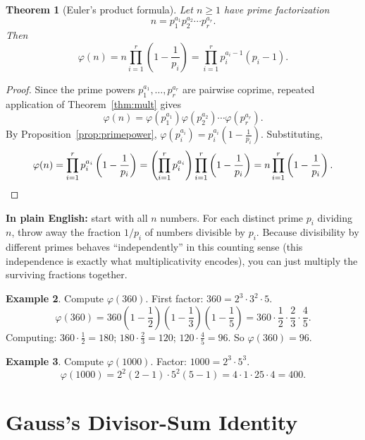 \documentclass[11pt]{article}
\newtheorem{theorem}{Theorem}[section]
\theoremstyle{definition}
\newtheorem{example}[theorem]{Example}
\theoremstyle{remark}
\begin{document}
\begin{theorem}[Euler's product formula]\label{thm:productformula}
Let $n \ge 1$ have prime factorization
\[
n = p_1^{a_1} p_2^{a_2} \cdots p_r^{a_r}.
\]
Then
\[
\varphi(n) = n \prod_{i=1}^{r}\left(1 - \frac{1}{p_i}\right) = \prod_{i=1}^r p_i^{a_i - 1}(p_i - 1).
\]
\end{theorem}

\begin{proof}
Since the prime powers $p_1^{a_1}, \dots, p_r^{a_r}$ are pairwise coprime, repeated application of Theorem~\ref{thm:mult} gives
\[
\varphi(n) = \varphi(p_1^{a_1}) \varphi(p_2^{a_2}) \cdots \varphi(p_r^{a_r}).
\]
By Proposition~\ref{prop:primepower}, $\varphi(p_i^{a_i}) = p_i^{a_i}\left(1 - \tfrac{1}{p_i}\right)$. Substituting,
\[
\varphi(n) = \prod_{i=1}^r p_i^{a_i}\left(1-\frac1{p_i}\right) = \left(\prod_{i=1}^r p_i^{a_i}\right)\prod_{i=1}^r\left(1-\frac1{p_i}\right) = n\prod_{i=1}^r\left(1 - \frac1{p_i}\right). \qedhere
\]
\end{proof}

\noindent\textbf{In plain English:} start with all $n$ numbers. For each distinct prime $p_i$ dividing $n$, throw away the fraction $1/p_i$ of numbers divisible by $p_i$. Because divisibility by different primes behaves ``independently'' in this counting sense (this independence is exactly what multiplicativity encodes), you can just multiply the surviving fractions together.

\begin{example}
Compute $\varphi(360)$. First factor: $360 = 2^3 \cdot 3^2 \cdot 5$.
\[
\varphi(360) = 360\left(1 - \frac12\right)\left(1-\frac13\right)\left(1-\frac15\right) = 360 \cdot \frac12 \cdot \frac23 \cdot \frac45.
\]
Computing: $360 \cdot \tfrac12 = 180$; $180 \cdot \tfrac23 = 120$; $120 \cdot \tfrac45 = 96$. So $\varphi(360) = 96$.
\end{example}

\begin{example}
Compute $\varphi(1000)$. Factor: $1000 = 2^3 \cdot 5^3$.
\[
\varphi(1000) = 2^2(2-1)\cdot 5^2(5-1) = 4\cdot 1 \cdot 25 \cdot 4 = 400.
\]
\end{example}

\section{Gauss's Divisor-Sum Identity}
\end{document}
